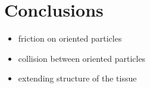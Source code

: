 \chapter{Conclusions}
\label{cha:conclusions}

\begin{itemize}
\item friction on oriented particles
\item collision between oriented particles
\item extending structure of the tissue
\end{itemize}